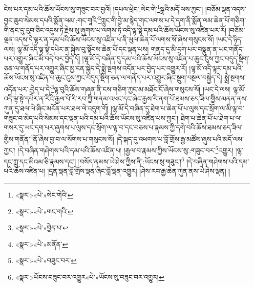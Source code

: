 ངེས་པར་དམ་པའི་ཆོས་ཡོངས་སུ་གཟུང་བར་བྱའོ། །དཔལ་ཕྲེང་:སེང་གེ་\footnote{«སྣར་»«པེ་»སེང་གེའི་}སྒྲའི་མདོ་ལས་ཀྱང་། །བཅོམ་ལྡན་འདས་བྱང་ཆུབ་སེམས་དཔའི་སྨོན་ལམ་:གང་གཱའི་\footnote{«སྣར་»«པེ་»གང་གའི་}ཀླུང་གི་བྱེ་མ་སྙེད་གང་ལགས་པ་དེ་དག་ནི་སྨོན་ལམ་ཆེན་པོ་གཅིག་གི་ནང་དུ་འུབ་ཅིང་འདུས་ཏེ་རྗེས་སུ་ཞུགས་པ་ལགས་ཏེ་འདི་ལྟ་སྟེ་དམ་པའི་ཆོས་ཡོངས་སུ་འཛིན་པར་རོ། །བཅོམ་ལྡན་འདས་དེ་ལྟར་ན་དམ་པའི་ཆོས་ཡོངས་སུ་འཛིན་པ་ནི་ཡུལ་ཆེན་པོ་ལགས་སོ་ཞེས་གསུངས་སོ། །ཡང་དེ་ཉིད་ལས། ལྷ་མོ་འདི་ལྟ་སྟེ་དཔེར་ན་སྐྱེས་བུ་སྟོབས་ཆེན་པོ་དང་ལྡན་པས། གནད་དུ་མི་དྲག་པར་བསྣུན་ན་ཡང་གནོད་པར་འགྱུར་ཞིང་མི་བདེ་བར་བྱེད་དོ། །ལྷ་མོ་དེ་བཞིན་དུ་དམ་པའི་ཆོས་ཡོངས་སུ་འཛིན་པ་ཆུང་ངུས་ཀྱང་བདུད་སྡིག་ཅན་ལ་གནོད་པར་འགྱུར་ཞིང་མྱ་ངན་སྐྱེད་དེ་སྨྲེ་སྔགས་འདོན་པར་བྱེད་པར་འགྱུར་རོ། །ལྷ་མོ་འདི་ལྟར་དམ་པའི་ཆོས་ཡོངས་སུ་འཛིན་པ་ཆུང་ངུས་ཀྱང་བདུད་སྡིག་ཅན་ལ་གནོད་པར་འགྱུར་ཞིང་སྡུག་བསྔལ་བསྐྱེད་དེ། སྨྲེ་སྔགས་འདོན་པར་:བྱེད་པ་དེ་\footnote{«སྣར་»«པེ་»བྱེད་པ་}ལྟ་བུའི་ཆོས་གཞན་ནི་ངས་གཅིག་ཀྱང་མ་མཐོང་ངོ་ཞེས་གསུངས་སོ། །ཡང་དེ་ལས། ལྷ་མོ་འདི་ལྟ་སྟེ་དཔེར་ན་རིའི་རྒྱལ་པོ་རི་རབ་ཀྱི་གནམ་འཕང་དང་ཞེང་རྒྱས་རི་ནག་པོ་ཐམས་ཅད་ཟིལ་གྱིས་མནན་ནས་ཀུན་དུ་ཐལ་ལེ་ཞིང་མངོན་པར་ཐལ་ལེ་འདུག་གོ། །ལྷ་མོ་དེ་བཞིན་དུ་ཐེག་པ་ཆེན་པོ་པ་ལུས་དང་སྲོག་ལ་མི་ལྟ་བ་གཟུང་བ་མེད་པའི་སེམས་དང་ལྡན་པའི་དམ་པའི་ཆོས་ཡོངས་སུ་འཛིན་པས་ཀྱང་། ཐེག་པ་ཆེན་པོ་པ་ཐེག་པ་ལ་གསར་དུ་ཡང་དག་པར་ཞུགས་པ་ལུས་དང་སྲོག་ལ་ལྟ་བ་དང་བཅས་པ་རྣམས་ཀྱི་དགེ་བའི་ཆོས་ཐམས་ཅད་ཟིལ་གྱིས་གནོན་\footnote{«སྣར་»«པེ་»མནོན་}ནོ་ཞེས་བྱ་བ་ལ་སོགས་པ་གསུངས་སོ། །དེ་སྐད་དུ་འཕགས་པ་བློ་གྲོས་རྒྱ་མཚོས་ཞུས་པའི་མདོ་ལས་ཀྱང་། །དེ་བཞིན་གཤེགས་པའི་དམ་པའི་ཆོས་འཛིན་པ། །རྒྱལ་བ་རྣམས་ཀྱིས་ཡོངས་སུ་:གཟུང་བར་\footnote{«སྣར་»«པེ་»བཟུང་བར་}འགྱུར། །ལྷ་དང་ཀླུ་དང་མིའམ་ཅི་རྣམས་དང་། །བསོད་ནམས་ཡེ་ཤེས་ཀྱིས་ནི་:ཡོངས་སུ་གཟུང་།\footnote{«སྣར་»ཡོངས་བཟུང་བར་འགྱུར«པེ་»ཡོངས་སུ་བཟུང་བར་འགྱུར།} །དེ་བཞིན་གཤེགས་པའི་དམ་པའི་ཆོས་འཛིན་པ། །དྲན་ལྡན་བློ་གྲོས་ལྡན་ཞིང་བློ་ལྡན་འགྱུར། །ཤེས་རབ་རྒྱ་ཆེན་ཀུན་ནས་ཡེ་ཤེས་ལྡན། །
